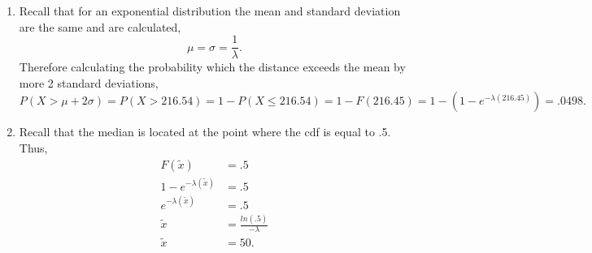 \documentclass[12pt]{article}
\theoremstyle{homework}
\begin{document}
\begin{enumerate}
\begin{enumerate}
\item Recall that for an exponential distribution the mean and standard deviation are the same and are calculated,
\begin{equation*}
  \mu = \sigma  = \frac{1}{\lambda}.
\end{equation*}
Therefore calculating the probability which the distance exceeds the mean by more 2 standard deviations,
\begin{equation*}
  P(X > \mu + 2\sigma) = P(X > 216.54) =1 - P(X \le 216.54)   = 1 - F(216.45) = 1 - (1-e^{-\lambda(216.45)}) = .0498.
\end{equation*}
\item Recall that the median is located at the point where the cdf is equal to .5. Thus,
\begin{align*}
  F(\widetilde{x}) &= .5\\
  1-e^{-\lambda(\widetilde{x})}&= .5\\
  e^{-\lambda(\widetilde{x})}&= .5\\
  \widetilde{x}&= \frac{ln(.5)}{-\lambda}\\
  \widetilde{x}&= 50.
\end{align*}
\end{enumerate}
\vspace{.5in}




\end{enumerate}
\end{document}

